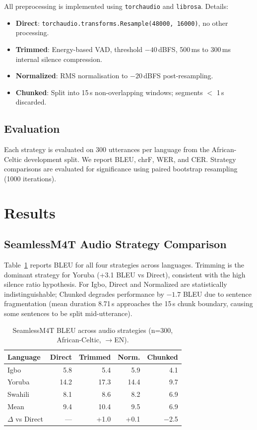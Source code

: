 \documentclass[a4paper]{article}
\newcommand{\dataAC}{African-Celtic}
\begin{document}
All preprocessing is implemented using \texttt{torchaudio} and \texttt{librosa}. Details:

\begin{itemize}
  \item \textbf{Direct}: \texttt{torchaudio.transforms.Resample(48000, 16000)}, no other processing.
  \item \textbf{Trimmed}: Energy-based VAD, threshold $-40$\,dBFS, 500\,ms to 300\,ms internal silence compression.
  \item \textbf{Normalized}: RMS normalisation to $-20$\,dBFS post-resampling.
  \item \textbf{Chunked}: Split into 15\,s non-overlapping windows; segments $<$ 1\,s discarded.
\end{itemize}

\subsection{Evaluation}

Each strategy is evaluated on 300 utterances per language from the \dataAC{} development split. We report BLEU, chrF, WER, and CER. Strategy comparisons are evaluated for significance using paired bootstrap resampling (1000 iterations).

\section{Results}
\label{sec:results}

\subsection{SeamlessM4T Audio Strategy Comparison}

Table~\ref{tab:sm_audio_bleu} reports BLEU for all four strategies across languages. Trimming is the dominant strategy for Yoruba (+3.1 BLEU vs Direct), consistent with the high silence ratio hypothesis. For Igbo, Direct and Normalized are statistically indistinguishable; Chunked degrades performance by $-1.7$ BLEU due to sentence fragmentation (mean duration 8.71\,s approaches the 15\,s chunk boundary, causing some sentences to be split mid-utterance).

\begin{table}[t]
\centering
\small
\caption{SeamlessM4T BLEU across audio strategies (n=300, \dataAC{}, $\to$EN).}
\label{tab:sm_audio_bleu}
\begin{tabular}{lrrrr}
\toprule
\textbf{Language} & \textbf{Direct} & \textbf{Trimmed} & \textbf{Norm.} & \textbf{Chunked} \\
\midrule
Igbo    &  5.8  &  5.4  &  5.9  &  4.1  \\
Yoruba  & 14.2  & 17.3  & 14.4  &  9.7  \\
Swahili &  8.1  &  8.6  &  8.2  &  6.9  \\
\midrule
Mean    &  9.4  & 10.4  &  9.5  &  6.9  \\
$\Delta$ vs Direct & — & +1.0 & +0.1 & $-$2.5 \\
\bottomrule
\end{tabular}
\end{table}
\end{document}
